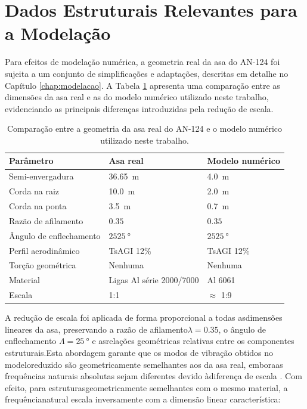 \documentclass[11pt,twoside,a4paper]{report}
\begin{document}
\section{Dados Estruturais Relevantes para a Modelação}

Para efeitos de modelação numérica, a geometria real da asa do AN-124 foi sujeita a um conjunto de simplificações e adaptações, descritas em detalhe no Capítulo \ref{chap:modelacao}. A Tabela \ref{tab:modelo_vs_real} apresenta uma comparação entre as dimensões da asa real e as do modelo numérico utilizado neste trabalho, evidenciando as principais diferenças introduzidas pela redução de escala.

\begin{table}[h!]
\centering
\caption{Comparação entre a geometria da asa real do AN-124 e o 
modelo numérico utilizado neste trabalho.}
\label{tab:modelo_vs_real}
\renewcommand{\arraystretch}{1.4}
\begin{tabularx}{\textwidth}{p{4.5cm} X X}
\toprule
\textbf{Parâmetro} & \textbf{Asa real} & \textbf{Modelo numérico} \\
\midrule
Semi-envergadura        & \SI{36.65}{\meter}    & \SI{4.0}{\meter} \\
Corda na raiz           & \SI{10.0}{\meter}     & \SI{2.0}{\meter} \\
Corda na ponta          & \SI{3.5}{\meter}      & \SI{0.7}{\meter} \\
Razão de afilamento     & $0.35$                & $0.35$ \\
Ângulo de enflechamento & $25\qty{25}{\degree}$ & $25\qty{25}{\degree}$ \\
Perfil aerodinâmico     & TsAGI 12\%            & TsAGI 12\% \\
Torção geométrica       & Nenhuma               & Nenhuma \\
Material                & Ligas Al série 2000/7000 & Al 6061 \\
Escala                  & 1:1                   & $\approx$ 1:9 \\
\bottomrule
\end{tabularx}
\end{table}

A redução de escala foi aplicada de forma proporcional a todas asdimensões lineares da asa, preservando a razão de afilamento$\lambda = 0.35$, o ângulo de enflechamento $\Lambda = \qty{25}{\degree}$ e asrelações geométricas relativas entre os componentes estruturais.Esta abordagem garante que os modos de vibração obtidos no modeloreduzido são geometricamente semelhantes aos da asa real, emboraas frequências naturais absolutas sejam diferentes devido àdiferença de escala \cite{Craig2006}. Com efeito, para estruturasgeometricamente semelhantes com o mesmo material, a frequêncianatural escala inversamente com a dimensão linear característica:
\end{document}
